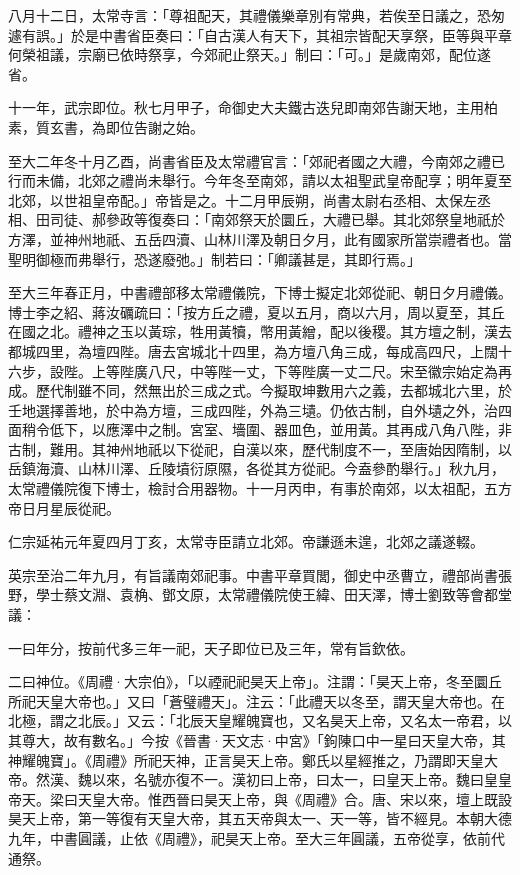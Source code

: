 \begin{pinyinscope}
 八月十二日，太常寺言：「尊祖配天，其禮儀樂章別有常典，若俟至日議之，恐匆遽有誤。」於是中書省臣奏曰：「自古漢人有天下，其祖宗皆配天享祭，臣等與平章何榮祖議，宗廟已依時祭享，今郊祀止祭天。」制曰：「可。」是歲南郊，配位遂省。



 十一年，武宗即位。秋七月甲子，命御史大夫鐵古迭兒即南郊告謝天地，主用柏素，質玄書，為即位告謝之始。



 至大二年冬十月乙酉，尚書省臣及太常禮官言：「郊祀者國之大禮，今南郊之禮已行而未備，北郊之禮尚未舉行。今年冬至南郊，請以太祖聖武皇帝配享；明年夏至北郊，以世祖皇帝配。」帝皆是之。十二月甲辰朔，尚書太尉右丞相、太保左丞相、田司徒、郝參政等復奏曰：「南郊祭天於圜丘，大禮已舉。其北郊祭皇地祇於方澤，並神州地祇、五岳四瀆、山林川澤及朝日夕月，此有國家所當崇禮者也。當聖明御極而弗舉行，恐遂廢弛。」制若曰：「卿議甚是，其即行焉。」



 至大三年春正月，中書禮部移太常禮儀院，下博士擬定北郊從祀、朝日夕月禮儀。博士李之紹、蔣汝礪疏曰：「按方丘之禮，夏以五月，商以六月，周以夏至，其丘在國之北。禮神之玉以黃琮，牲用黃犢，幣用黃繒，配以後稷。其方壇之制，漢去都城四里，為壇四陛。唐去宮城北十四里，為方壇八角三成，每成高四尺，上闊十六步，設陛。上等陛廣八尺，中等陛一丈，下等陛廣一丈二尺。宋至徽宗始定為再成。歷代制雖不同，然無出於三成之式。今擬取坤數用六之義，去都城北六里，於壬地選擇善地，於中為方壇，三成四陛，外為三壝。仍依古制，自外壝之外，治四面稍令低下，以應澤中之制。宮室、墻圍、器皿色，並用黃。其再成八角八陛，非古制，難用。其神州地祇以下從祀，自漢以來，歷代制度不一，至唐始因隋制，以岳鎮海瀆、山林川澤、丘陵墳衍原隰，各從其方從祀。今盍參酌舉行。」秋九月，太常禮儀院復下博士，檢討合用器物。十一月丙申，有事於南郊，以太祖配，五方帝日月星辰從祀。



 仁宗延祐元年夏四月丁亥，太常寺臣請立北郊。帝謙遜未遑，北郊之議遂輟。



 英宗至治二年九月，有旨議南郊祀事。中書平章買閭，御史中丞曹立，禮部尚書張野，學士蔡文淵、袁桷、鄧文原，太常禮儀院使王緯、田天澤，博士劉致等會都堂議：



 一曰年分，按前代多三年一祀，天子即位已及三年，常有旨欽依。



 二曰神位。《周禮·大宗伯》，「以禋祀祀昊天上帝」。注謂：「昊天上帝，冬至圜丘所祀天皇大帝也。」又曰「蒼璧禮天」。注云：「此禮天以冬至，謂天皇大帝也。在北極，謂之北辰。」又云：「北辰天皇耀魄寶也，又名昊天上帝，又名太一帝君，以其尊大，故有數名。」今按《晉書·天文志·中宮》「鉤陳口中一星曰天皇大帝，其神耀魄寶」。《周禮》所祀天神，正言昊天上帝。鄭氏以星經推之，乃謂即天皇大帝。然漢、魏以來，名號亦復不一。漢初曰上帝，曰太一，曰皇天上帝。魏曰皇皇帝天。梁曰天皇大帝。惟西晉曰昊天上帝，與《周禮》合。唐、宋以來，壇上既設昊天上帝，第一等復有天皇大帝，其五天帝與太一、天一等，皆不經見。本朝大德九年，中書圓議，止依《周禮》，祀昊天上帝。至大三年圓議，五帝從享，依前代通祭。




\end{pinyinscope}
